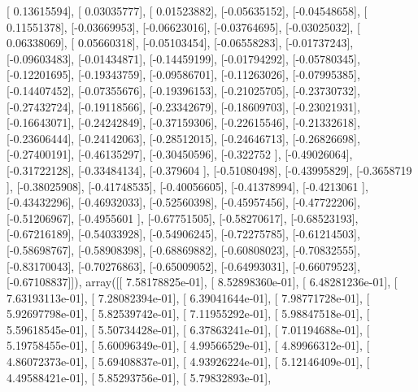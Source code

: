 \documentclass{article}
\begin{document}
       [ 0.13615594],
       [ 0.03035777],
       [ 0.01523882],
       [-0.05635152],
       [-0.04548658],
       [ 0.11551378],
       [-0.03669953],
       [-0.06623016],
       [-0.03764695],
       [-0.03025032],
       [ 0.06338069],
       [ 0.05660318],
       [-0.05103454],
       [-0.06558283],
       [-0.01737243],
       [-0.09603483],
       [-0.01434871],
       [-0.14459199],
       [-0.01794292],
       [-0.05780345],
       [-0.12201695],
       [-0.19343759],
       [-0.09586701],
       [-0.11263026],
       [-0.07995385],
       [-0.14407452],
       [-0.07355676],
       [-0.19396153],
       [-0.21025705],
       [-0.23730732],
       [-0.27432724],
       [-0.19118566],
       [-0.23342679],
       [-0.18609703],
       [-0.23021931],
       [-0.16643071],
       [-0.24242849],
       [-0.37159306],
       [-0.22615546],
       [-0.21332618],
       [-0.23606444],
       [-0.24142063],
       [-0.28512015],
       [-0.24646713],
       [-0.26826698],
       [-0.27400191],
       [-0.46135297],
       [-0.30450596],
       [-0.322752  ],
       [-0.49026064],
       [-0.31722128],
       [-0.33484134],
       [-0.379604  ],
       [-0.51080498],
       [-0.43995829],
       [-0.3658719 ],
       [-0.38025908],
       [-0.41748535],
       [-0.40056605],
       [-0.41378994],
       [-0.4213061 ],
       [-0.43432296],
       [-0.46932033],
       [-0.52560398],
       [-0.45957456],
       [-0.47722206],
       [-0.51206967],
       [-0.4955601 ],
       [-0.67751505],
       [-0.58270617],
       [-0.68523193],
       [-0.67216189],
       [-0.54033928],
       [-0.54906245],
       [-0.72275785],
       [-0.61214503],
       [-0.58698767],
       [-0.58908398],
       [-0.68869882],
       [-0.60808023],
       [-0.70832555],
       [-0.83170043],
       [-0.70276863],
       [-0.65009052],
       [-0.64993031],
       [-0.66079523],
       [-0.67108837]]), array([[  7.58178825e-01],
       [  8.52898360e-01],
       [  6.48281236e-01],
       [  7.63193113e-01],
       [  7.28082394e-01],
       [  6.39041644e-01],
       [  7.98771728e-01],
       [  5.92697798e-01],
       [  5.82539742e-01],
       [  7.11955292e-01],
       [  5.98847518e-01],
       [  5.59618545e-01],
       [  5.50734428e-01],
       [  6.37863241e-01],
       [  7.01194688e-01],
       [  5.19758455e-01],
       [  5.60096349e-01],
       [  4.99566529e-01],
       [  4.89966312e-01],
       [  4.86072373e-01],
       [  5.69408837e-01],
       [  4.93926224e-01],
       [  5.12146409e-01],
       [  4.49588421e-01],
       [  5.85293756e-01],
       [  5.79832893e-01],
\end{document}
